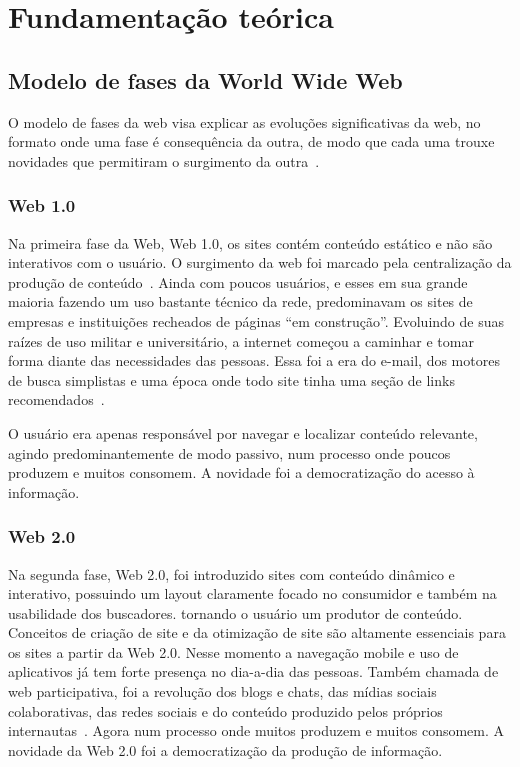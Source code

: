 \chapter{Fundamentação teórica}

\section{Modelo de fases da World Wide Web}

O modelo de fases da web visa explicar as evoluções significativas da web, no formato onde uma fase é consequência da outra, de modo que cada uma trouxe novidades que permitiram o surgimento da outra~\cite{Web32}.

\subsection{Web 1.0}

Na primeira fase da Web, Web 1.0, os sites contém conteúdo estático e não são interativos com o usuário.
O surgimento da web foi marcado pela centralização da produção de conteúdo~\cite{Web32}.
Ainda com poucos usuários, e esses em sua grande maioria fazendo um uso bastante técnico da rede, predominavam os sites de empresas e instituições recheados de páginas ``em construção''.
Evoluindo de suas raízes de uso militar e universitário, a internet começou a caminhar e tomar forma diante das necessidades das pessoas.
Essa foi a era do e-mail, dos motores de busca simplistas e uma época onde todo site tinha uma seção de links recomendados~\cite{Web32}.

O usuário era apenas responsável por navegar e localizar conteúdo relevante, agindo predominantemente de modo passivo, num processo onde poucos produzem e muitos consomem.
A novidade foi a democratização do acesso à informação.

\subsection{Web 2.0}

Na segunda fase, Web 2.0, foi introduzido sites com conteúdo dinâmico e interativo, possuindo um layout claramente focado no consumidor e também na usabilidade dos buscadores. tornando o usuário um produtor de conteúdo.
Conceitos de criação de site e da otimização de site são altamente essenciais para os sites a partir da Web 2.0.
Nesse momento a navegação mobile e uso de aplicativos já tem forte presença no dia-a-dia das pessoas.
Também chamada de web participativa, foi a revolução dos blogs e chats, das mídias sociais colaborativas, das redes sociais e do conteúdo produzido pelos próprios internautas~\cite{Web32}.
Agora num processo onde muitos produzem e muitos consomem.
A novidade da Web 2.0 foi a democratização da produção de informação.

